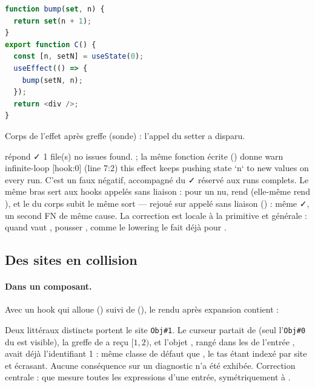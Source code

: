 \begin{lstlisting}[language=TypeScript,caption={Un setter appelé dans un \code{return} (\file{/tmp/ircheck/ret/Ret.tsx})}]
function bump(set, n) {
  return set(n + 1);
}
export function C() {
  const [n, setN] = useState(0);
  useEffect(() => {
    bump(setN, n);
  });
  return <div />;
}
\end{lstlisting}
Corps de l'effet après greffe (sonde) : l'appel du setter a disparu.
 répond \og ✓ 1 file(s) no issues found.\fg{} ; la même fonction écrite  () donne \og warn infinite-loop [hook:0] (line 7:2) this effect keeps pushing state `n` to new values on every run\fg{}. C'est un faux négatif, accompagné du \og ✓\fg{} réservé aux runs complets. Le même bras sert aux hooks appelés sans liaison : pour un  nu,  rend  (elle-même rend ), et le  du corps subit le même sort --- rejoué sur  appelé  sans liaison () : même \og ✓\fg{}, un second FN de même cause.
La correction est locale à la primitive et générale : quand  vaut , pousser , comme le lowering le fait déjà pour .

\subsection{Des sites en collision}

\paragraph{Dans un composant.} Avec un hook  qui alloue () suivi de  (), le rendu après expansion contient :
Deux littéraux distincts portent le site \texttt{Obj\#1}. Le curseur partait de  (seul l'\texttt{Obj\#0} du  est visible), la greffe de  a reçu $[1, 2)$, et l'objet , rangé dans les  de l'entrée , avait déjà l'identifiant 1 : même classe de défaut que , le tas étant indexé par site et  écrasant. Aucune conséquence sur un diagnostic n'a été exhibée. Correction centrale : que  mesure toutes les expressions d'une entrée, symétriquement à .

